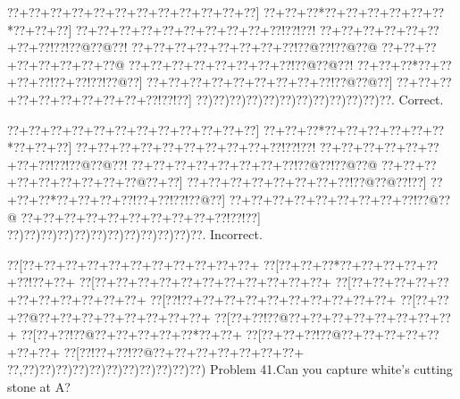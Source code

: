 \documentclass[a5paper]{article}
\begin{document}
\begin{center}
{\goo
\0??+\0??+\0??+\0??+\0??+\0??+\0??+\0??+\0??+\0??+\0??+\0??]
\0??+\0??+\0??*\0??+\0??+\0??+\0??+\0??+\0??*\0??+\0??+\0??]
\0??+\0??+\0??+\0??+\0??+\0??+\0??+\0??+\0??+\0??!\0??!\0??!
\0??+\0??+\0??+\0??+\0??+\0??+\0??+\0??!\0??!\0??@\0??@\0??!
\0??+\0??+\0??+\0??+\0??+\0??+\0??+\0??!\0??@\0??!\0??@\0??@
\0??+\0??+\0??+\0??+\0??+\0??+\0??+\0??@
\0??+\0??+\0??+\0??+\0??+\0??+\0??+\0??!\0??@\0??@\0??!
\0??+\0??+\0??*\0??+\0??+\0??+\0??!\0??+\0??!\0??!\0??@\0??]
\0??+\0??+\0??+\0??+\0??+\0??+\0??+\0??+\0??!\0??@\0??@\0??]
\0??+\0??+\0??+\0??+\0??+\0??+\0??+\0??+\0??+\0??!\0??!\0??]
\0??)\0??)\0??)\0??)\0??)\0??)\0??)\0??)\0??)\0??)\0??)\0??.
}
Correct. 

\end{center}
\begin{center}
{\goo
\0??+\0??+\0??+\0??+\0??+\0??+\0??+\0??+\0??+\0??+\0??+\0??]
\0??+\0??+\0??*\0??+\0??+\0??+\0??+\0??+\0??*\0??+\0??+\0??]
\0??+\0??+\0??+\0??+\0??+\0??+\0??+\0??+\0??+\0??!\0??!\0??!
\0??+\0??+\0??+\0??+\0??+\0??+\0??+\0??!\0??!\0??@\0??@\0??!
\0??+\0??+\0??+\0??+\0??+\0??+\0??+\0??!\0??@\0??!\0??@\0??@
\0??+\0??+\0??+\0??+\0??+\0??+\0??+\0??+\0??@\0??+\0??]
\0??+\0??+\0??+\0??+\0??+\0??+\0??+\0??!\0??@\0??@\0??!\0??]
\0??+\0??+\0??*\0??+\0??+\0??+\0??!\0??+\0??!\0??!\0??@\0??]
\0??+\0??+\0??+\0??+\0??+\0??+\0??+\0??+\0??!\0??@\0??@
\0??+\0??+\0??+\0??+\0??+\0??+\0??+\0??+\0??+\0??!\0??!\0??]
\0??)\0??)\0??)\0??)\0??)\0??)\0??)\0??)\0??)\0??)\0??)\0??.
}
Incorrect. 

\end{center}
\newpage
\begin{center}
{\goo
\0??[\0??+\0??+\0??+\0??+\0??+\0??+\0??+\0??+\0??+\0??+\0??+
\0??[\0??+\0??+\0??*\0??+\0??+\0??+\0??+\0??+\0??!\0??+\0??+
\0??[\0??+\0??+\0??+\0??+\0??+\0??+\0??+\0??+\0??+\0??+\0??+
\0??[\0??+\0??+\0??+\0??+\0??+\0??+\0??+\0??+\0??+\0??+\0??+
\0??[\0??!\0??+\0??+\0??+\0??+\0??+\0??+\0??+\0??+\0??+\0??+
\0??[\0??+\0??+\0??@\0??+\0??+\0??+\0??+\0??+\0??+\0??+\0??+
\0??[\0??+\0??!\0??@\0??+\0??+\0??+\0??+\0??+\0??+\0??+\0??+
\0??[\0??+\0??!\0??@\0??+\0??+\0??+\0??+\0??*\0??+\0??+
\0??[\0??+\0??+\0??!\0??@\0??+\0??+\0??+\0??+\0??+\0??+\0??+
\0??[\0??!\0??+\0??!\0??@\0??+\0??+\0??+\0??+\0??+\0??+\0??+
\0??,\0??)\0??)\0??)\0??)\0??)\0??)\0??)\0??)\0??)\0??)\0??)
}
Problem 41.Can you capture white's cutting stone at A?

\end{center}
\end{document}
